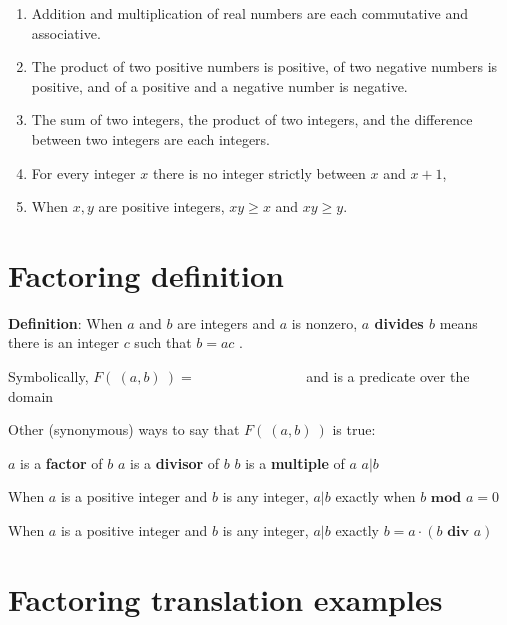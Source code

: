 \documentclass[12pt, oneside]{article}
\begin{document}
\begin{enumerate}
    \item Addition and multiplication of real 
    numbers are each commutative and associative. 
    \vspace{25pt}
    \item The product of two positive numbers is positive, of 
    two negative numbers is positive, and of a positive and a negative number is negative.
    \vspace{25pt}
    \item The sum of two integers, the product of two integers, and the 
    difference between two integers are each integers.
    \vspace{25pt}
    \item For every integer $x$ there is no integer strictly between $x$ and $x+1$, 
    \vspace{25pt}
    \item When $x, y$ are positive integers, $xy \geq x$ and $xy \geq y$.
    \vspace{25pt}
\end{enumerate}
 \vfill
\section*{Factoring definition}


{\bf Definition}: When $a$ and $b$ are integers and $a$ is nonzero, 
{\bf $a$ divides $b$} means there is an integer $c$ such that $b = ac$ . 


Symbolically, $F(~(a,b)~) = \phantom{\exists c\in \mathbb{Z}~(b=ac)}$
and is  a predicate over the domain \underline{}


Other (synonymous) ways to say that $F(~(a,b)~)$ is true: 
\begin{center}
$a$ is a {\bf factor} of $b$
\qquad 
$a$ is a {\bf divisor} of $b$
\qquad  $b$ is a {\bf multiple} of $a$
\qquad
$a | b$
\end{center}

When $a$ is a positive integer and $b$ is any integer, $a | b$
exactly when $b \textbf{ mod } a = 0$

When $a$ is a positive integer and $b$ is any integer, $a | b$
exactly $b = a \cdot (b \textbf{ div } a)$ \vfill
\section*{Factoring translation examples}
\end{document}
